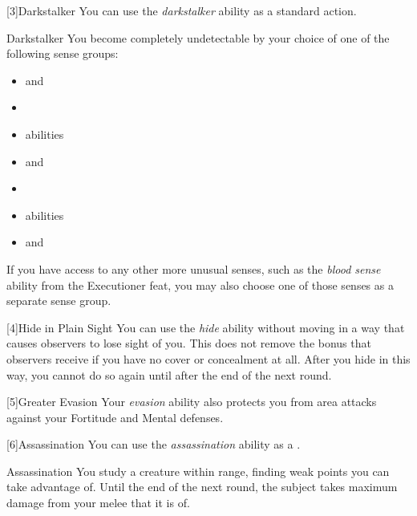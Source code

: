         [3]{Darkstalker} You can use the \textit{darkstalker} ability as a standard action.
        \begin{attuneability}{Darkstalker}
            \rankline
            You become completely undetectable by your choice of one of the following sense groups:
            \begin{itemize}
                \item {} and 
                \item {}
                \item {} abilities
                \item {} and 
                \item {}
                \item {} abilities
                \item {} and 
            \end{itemize}
            If you have access to any other more unusual senses, such as the \textit{blood sense} ability from the Executioner feat, you may also choose one of those senses as a separate sense group.
        \end{attuneability}

        [4]{Hide in Plain Sight}
        You can use the \textit{hide} ability without moving in a way that causes observers to lose sight of you.
        This does not remove the bonus that observers receive if you have no cover or concealment at all.
        After you hide in this way, you cannot do so again until after the end of the next round.

        [5]{Greater Evasion} Your \textit{evasion} ability also protects you from area attacks against your Fortitude and Mental defenses.

        [6]{Assassination} You can use the \textit{assassination} ability as a .
        \begin{durationability}{Assassination}
            \rankline
            You study a creature within \rngmed range, finding weak points you can take advantage of.
            Until the end of the next round, the subject takes maximum damage from your melee  that it is \unaware of.
        \end{durationability}

